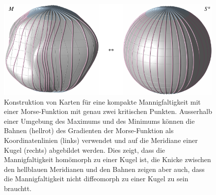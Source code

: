 %
%
%
\begin{figure}
\centering
\includegraphics{chapters/120-topologie/images/sphere.pdf}
\caption{Konstruktion von Karten für eine kompakte Mannigfaltigkeit mit
einer Morse-Funktion mit genau zwei kritischen Punkten.
Ausserhalb einer Umgebung des Maximums und des Minimums können die Bahnen
(hellrot)
des Gradienten der Morse-Funktion als Koordinatenlinien (links) verwendet
und auf die Meridiane einer Kugel (rechts) abgebildet werden.
Dies zeigt, dass die Mannigfaltigkeit homömorph zu einer Kugel ist, die
Knicke zwischen den hellblauen Meridianen und den Bahnen zeigen aber auch,
dass die Mannigfaltigkeit nicht diffeomorph zu einer Kugel zu sein brauchtt.
\label{buch:topologie:morse:fig:kartoffel}}
\end{figure}
